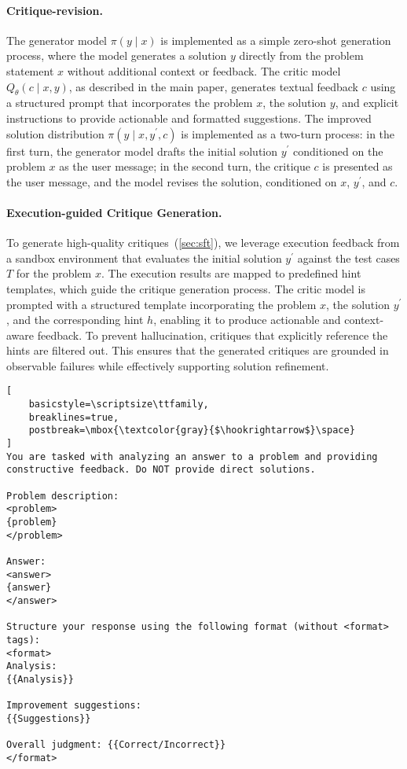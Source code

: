 \paragraph{Critique-revision.} The generator model $\pi(y \mid x)$ is implemented as a simple zero-shot generation process, where the model generates a solution $y$ directly from the problem statement $x$ without additional context or feedback. The critic model $Q_\theta(c \mid x, y)$, as described in the main paper, generates textual feedback $c$ using a structured prompt that incorporates the problem $x$, the solution $y$, and explicit instructions to provide actionable and formatted suggestions. The improved solution distribution $\pi(y \mid x, y^\prime, c)$ is implemented as a two-turn process: in the first turn, the generator model drafts the initial solution $y^\prime$ conditioned on the problem $x$ as the user message; in the second turn, the critique $c$ is presented as the user message, and the model revises the solution, conditioned on $x$, $y^\prime$, and $c$.

\paragraph{Execution-guided Critique Generation.}
To generate high-quality critiques~(\cref{sec:sft}), we leverage execution feedback from a sandbox environment that evaluates the initial solution $y^\prime$ against the test cases $T$ for the problem $x$. The execution results are mapped to predefined hint templates, which guide the critique generation process. The critic model is prompted with a structured template incorporating the problem $x$, the solution $y^\prime$, and the corresponding hint $h$, enabling it to produce actionable and context-aware feedback. To prevent hallucination, critiques that explicitly reference the hints are filtered out. This ensures that the generated critiques are grounded in observable failures while effectively supporting solution refinement.

\begin{table}[h!]
\begin{tcolorbox}[
    colback=gray!5,
    colframe=gray!75,
    title=Prompt Template for Critique Generation,
    fonttitle=\bfseries
]
\begin{lstlisting}[
    basicstyle=\scriptsize\ttfamily,
    breaklines=true,
    postbreak=\mbox{\textcolor{gray}{$\hookrightarrow$}\space}
]
You are tasked with analyzing an answer to a problem and providing constructive feedback. Do NOT provide direct solutions.

Problem description:
<problem>
{problem}
</problem>

Answer:
<answer>
{answer}
</answer>

Structure your response using the following format (without <format> tags):
<format>
Analysis:
{{Analysis}}

Improvement suggestions:
{{Suggestions}}

Overall judgment: {{Correct/Incorrect}}
</format>
\end{lstlisting}
\end{tcolorbox}
\end{table}

